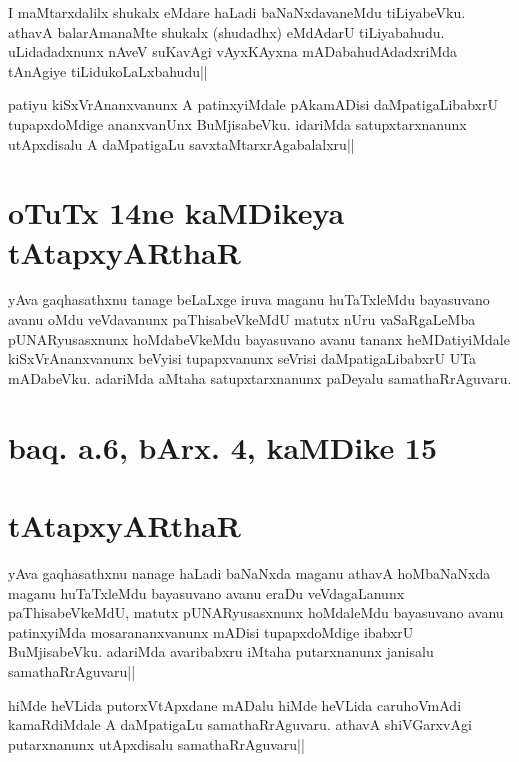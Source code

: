 \stext

\begin{artha}
I maMtarxdalilx shukalx eMdare haLadi baNaNxdavaneMdu tiLiyabeVku. 
athavA balarAmanaMte shukalx (shudadhx) eMdAdarU tiLiyabahudu. 
uLidadadxnunx nAveV suKavAgi vAyxKAyxna mADabahudAdadxriMda tAnAgiye 
tiLidukoLaLxbahudu||
\end{artha}


\begin{artha}
patiyu kiSxVrAnanxvanunx A patinxyiMdale pAkamADisi daMpatigaLibabxrU 
tupapxdoMdige ananxvanUnx BuMjisabeVku. idariMda satupxtarxnanunx 
utApxdisalu A daMpatigaLu savxtaMtarxrAgabalalxru||
\end{artha}

\section*{oTuTx 14ne kaMDikeya tAtapxyARthaR}
yAva gaqhasathxnu tanage beLaLxge iruva maganu huTaTxleMdu bayasuvano 
avanu oMdu veVdavanunx paThisabeVkeMdU matutx nUru vaSaRgaLeMba 
pUNARyusasxnunx hoMdabeVkeMdu bayasuvano avanu tananx heMDatiyiMdale 
kiSxVrAnanxvanunx beVyisi tupapxvanunx seVrisi daMpatigaLibabxrU UTa 
mADabeVku. adariMda aMtaha satupxtarxnanunx paDeyalu samathaRrAguvaru.

\section*{baq. a.6, bArx. 4, kaMDike 15}

\stext

\section*{tAtapxyARthaR}
yAva gaqhasathxnu nanage haLadi baNaNxda maganu athavA hoMbaNaNxda 
maganu huTaTxleMdu bayasuvano avanu eraDu veVdagaLanunx 
paThisabeVkeMdU, matutx pUNARyusasxnunx hoMdaleMdu bayasuvano avanu 
patinxyiMda mosarananxvanunx mADisi tupapxdoMdige ibabxrU 
BuMjisabeVku. adariMda avaribabxru iMtaha putarxnanunx janisalu 
samathaRrAguvaru||

\begin{artha}
hiMde heVLida putorxVtApxdane mADalu hiMde heVLida caruhoVmAdi 
kamaRdiMdale A daMpatigaLu samathaRrAguvaru. athavA shiVGarxvAgi 
putarxnanunx utApxdisalu samathaRrAguvaru||
\end{artha}

